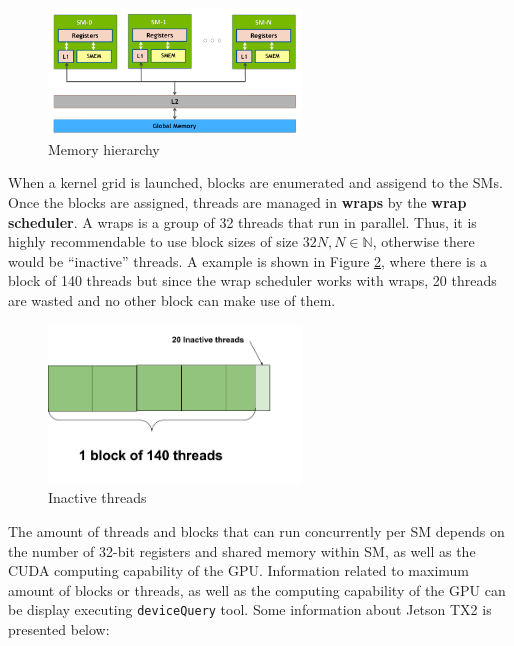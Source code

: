 \documentclass[
  12pt,
  a4paperpaper,
]{report}
\begin{document}
\begin{figure}
\centering
\includegraphics[width=0.6\textwidth,height=\textheight]{source/figures/sm_memory.png}
\caption{Memory hierarchy \label{img:sm_memory}}
\end{figure}

When a kernel grid is launched, blocks are enumerated and assigend to the
SMs. Once the blocks are assigned, threads are managed in \textbf{wraps}
by the \textbf{wrap scheduler}. A wraps is a group of 32 threads that
run in parallel. Thus, it is highly recommendable to use block sizes of
size \(32N, N \in \mathbb{N}\), otherwise there would be ``inactive''
threads. A example is shown in Figure \ref{img:inactive_thread}, where
there is a block of 140 threads but since the wrap scheduler works with
wraps, 20 threads are wasted and no other block can make use of them.

\begin{figure}
\centering
\includegraphics[width=0.6\textwidth,height=\textheight]{source/figures/inactive_thread.png}
\caption{Inactive threads \label{img:inactive_thread}}
\end{figure}

The amount of threads and blocks that can run concurrently per SM
depends on the number of 32-bit registers and shared memory within SM,
as well as the CUDA computing capability of the GPU. Information related
to maximum amount of blocks or threads, as well as the computing
capability of the GPU can be display executing \texttt{deviceQuery}
tool. Some information about Jetson TX2 is presented below:
\end{document}
